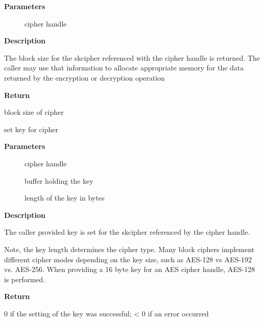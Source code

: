 \documentclass[a4paper,8pt,english]{sphinxmanual}
\begin{document}
\textbf{Parameters}
\begin{description}
\item[{}] \leavevmode
cipher handle

\end{description}

\textbf{Description}

The block size for the skcipher referenced with the cipher handle is
returned. The caller may use that information to allocate appropriate
memory for the data returned by the encryption or decryption operation

\textbf{Return}

block size of cipher

\begin{fulllineitems}
\label{crypto/api-skcipher:c.crypto_skcipher_setkey}
set key for cipher

\end{fulllineitems}


\textbf{Parameters}
\begin{description}
\item[{}] \leavevmode
cipher handle

\item[{}] \leavevmode
buffer holding the key

\item[{}] \leavevmode
length of the key in bytes

\end{description}

\textbf{Description}

The caller provided key is set for the skcipher referenced by the cipher
handle.

Note, the key length determines the cipher type. Many block ciphers implement
different cipher modes depending on the key size, such as AES-128 vs AES-192
vs. AES-256. When providing a 16 byte key for an AES cipher handle, AES-128
is performed.

\textbf{Return}

0 if the setting of the key was successful; \textless{} 0 if an error occurred
\end{document}
